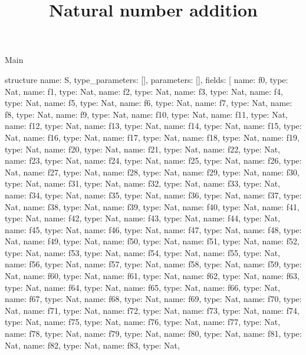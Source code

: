 \begin{lexlean}{Main}
\title{Natural number addition}
\begin{semanticmodule}
structure{
  name: S,
  type_parameters: [],
  parameters: [],
  fields: [
    {name: f0, type: Nat},
    {name: f1, type: Nat},
    {name: f2, type: Nat},
    {name: f3, type: Nat},
    {name: f4, type: Nat},
    {name: f5, type: Nat},
    {name: f6, type: Nat},
    {name: f7, type: Nat},
    {name: f8, type: Nat},
    {name: f9, type: Nat},
    {name: f10, type: Nat},
    {name: f11, type: Nat},
    {name: f12, type: Nat},
    {name: f13, type: Nat},
    {name: f14, type: Nat},
    {name: f15, type: Nat},
    {name: f16, type: Nat},
    {name: f17, type: Nat},
    {name: f18, type: Nat},
    {name: f19, type: Nat},
    {name: f20, type: Nat},
    {name: f21, type: Nat},
    {name: f22, type: Nat},
    {name: f23, type: Nat},
    {name: f24, type: Nat},
    {name: f25, type: Nat},
    {name: f26, type: Nat},
    {name: f27, type: Nat},
    {name: f28, type: Nat},
    {name: f29, type: Nat},
    {name: f30, type: Nat},
    {name: f31, type: Nat},
    {name: f32, type: Nat},
    {name: f33, type: Nat},
    {name: f34, type: Nat},
    {name: f35, type: Nat},
    {name: f36, type: Nat},
    {name: f37, type: Nat},
    {name: f38, type: Nat},
    {name: f39, type: Nat},
    {name: f40, type: Nat},
    {name: f41, type: Nat},
    {name: f42, type: Nat},
    {name: f43, type: Nat},
    {name: f44, type: Nat},
    {name: f45, type: Nat},
    {name: f46, type: Nat},
    {name: f47, type: Nat},
    {name: f48, type: Nat},
    {name: f49, type: Nat},
    {name: f50, type: Nat},
    {name: f51, type: Nat},
    {name: f52, type: Nat},
    {name: f53, type: Nat},
    {name: f54, type: Nat},
    {name: f55, type: Nat},
    {name: f56, type: Nat},
    {name: f57, type: Nat},
    {name: f58, type: Nat},
    {name: f59, type: Nat},
    {name: f60, type: Nat},
    {name: f61, type: Nat},
    {name: f62, type: Nat},
    {name: f63, type: Nat},
    {name: f64, type: Nat},
    {name: f65, type: Nat},
    {name: f66, type: Nat},
    {name: f67, type: Nat},
    {name: f68, type: Nat},
    {name: f69, type: Nat},
    {name: f70, type: Nat},
    {name: f71, type: Nat},
    {name: f72, type: Nat},
    {name: f73, type: Nat},
    {name: f74, type: Nat},
    {name: f75, type: Nat},
    {name: f76, type: Nat},
    {name: f77, type: Nat},
    {name: f78, type: Nat},
    {name: f79, type: Nat},
    {name: f80, type: Nat},
    {name: f81, type: Nat},
    {name: f82, type: Nat},
    {name: f83, type: Nat},
}
\end{semanticmodule}
\end{lexlean}
